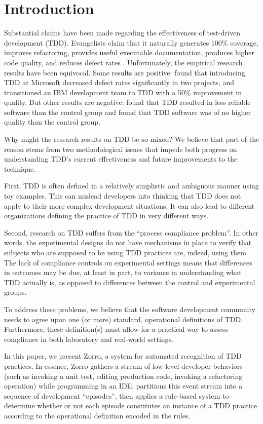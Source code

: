 \documentclass[smallextended]{svjour3}     %
\begin{document}
\section{Introduction}
\label{intro}

Substantial claims have been made regarding the effectiveness of
test-driven development (TDD). Evangelists claim that it naturally
generates 100\% coverage, improves refactoring, provides useful executable
documentation, produces higher code quality, and reduces defect rates
\cite{Beck:03}.  Unfortunately, the empirical research results have been
equivocal.  Some results are positive: \cite{Bhat:06} found that
introducing TDD at Microsoft decreased defect rates significantly in two
projects, and \cite{Maximilien:03} transitioned an IBM development team to
TDD with a 50\% improvement in quality. But other results are negative:
\cite{Muller:02} found that TDD resulted in less reliable software than the
control group and \cite{Erdogmus:05} found that TDD software was of no
higher quality than the control group.

Why might the research results on TDD be so mixed?  We believe that part of
the reason stems from two methodological issues that impede both progress
on understanding TDD's current effectiveness and future improvements to the
technique. 

First, TDD is often defined in a relatively simplistic and ambiguous manner
using toy examples.  This can mislead developers into thinking that TDD
does not apply to their more complex development situations. It can also
lead to different organizations defining the practice of TDD in very
different ways.

Second, research on TDD suffers from the ``process compliance problem''.
In other words, the experimental designs do not have mechanisms in place to
verify that subjects who are supposed to be using TDD practices are,
indeed, using them.  The lack of compliance controls on experimental
settings means that differences in outcomes may be due, at least in part,
to variance in understanding what TDD actually is, as opposed to
differences between the control and experimental groups.

To address these problems, we believe that the software development
community needs to agree upon one (or more) standard, operational
definitions of TDD. Furthermore, these definition(s) must allow for a
practical way to assess compliance in both laboratory and real-world
settings.

In this paper, we present Zorro, a system for automated recognition of TDD
practices.  In essence, Zorro gathers a stream of low-level developer
behaviors (such as invoking a unit test, editing production code, invoking
a refactoring operation) while programming in an IDE, partitions this event
stream into a sequence of development ``episodes'', then applies a
rule-based system to determine whether or not each episode constitutes an
instance of a TDD practice according to the operational definition encoded in the rules.
\end{document}
